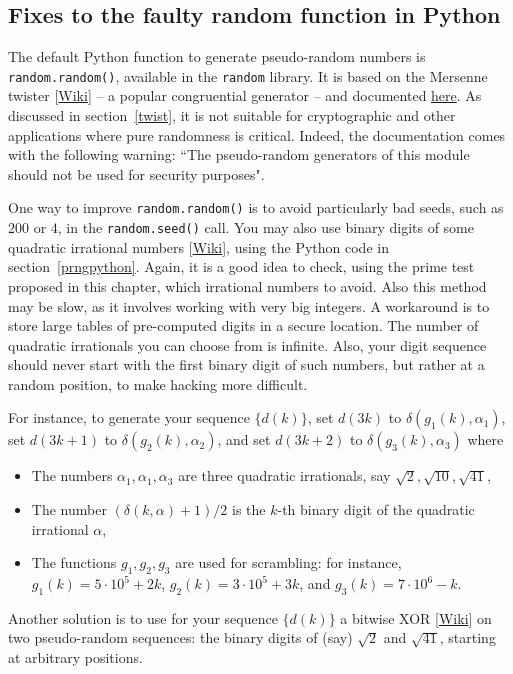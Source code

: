 \documentclass[oneside,10pt]{book}
\begin{document}
\subsection{Fixes to the faulty random function in Python}\label{fixp}

The default Python function to generate pseudo-random numbers is \texttt{random.random()}, available in the \texttt{random} library.
It is based on the \textcolor{index}{Mersenne twister} [\href{https://en.wikipedia.org/wiki/Mersenne_Twister}{Wiki}] -- 
a popular 
 \textcolor{index}{congruential generator} -- 
and documented \href{https://docs.python.org/3/library/random.html}{here}. As discussed in section~\ref{twist}, it is not suitable for cryptographic and other applications where pure randomness is critical. Indeed, the documentation comes with the following warning: ``The pseudo-random generators of this module should not be used for security purposes". 

One way to improve  \texttt{random.random()} is to avoid particularly bad seeds, such as $200$ or $4$, in the \texttt{random.seed()} call. You may also use binary digits of some 
\textcolor{index}{quadratic irrational numbers} [\href{https://en.wikipedia.org/wiki/Quadratic_irrational_number}{Wiki}], using the Python code in section~\ref{prngpython}. Again, it is a good idea to check, using the prime test proposed in this chapter, which irrational numbers to avoid. Also this method may be slow, as it involves working with very big integers. A workaround is to store large tables of pre-computed digits in a secure location. The number of quadratic irrationals you can choose from is infinite. Also, your digit sequence
 should never start with the first binary digit of such numbers, but rather at a random position, to make hacking more difficult. 

For instance, to generate your sequence $\{d(k)\}$, set $d(3k)$ to $\delta(g_1(k),\alpha_1)$, set 
 $d(3k+1)$ to $\delta(g_2(k),\alpha_2)$, and set  $d(3k+2)$ to $\delta(g_3(k),\alpha_3)$ where 
\begin{itemize}
\item The numbers $\alpha_1, \alpha_1, \alpha_3$ are three quadratic irrationals, say $\sqrt{2},\sqrt{10},\sqrt{41}$,
\item The number $(\delta(k,\alpha)+1)/2$ is the $k$-th binary digit of the quadratic irrational $\alpha$, 
\item The functions $g_1,g_2,g_3$ are used for scrambling: for instance, 
$g_1(k)=5\cdot 10^5 +2k$, $g_2(k)=3\cdot 10^5 +3k$, and $g_3(k)=7\cdot 10^6 -k$.
\end{itemize}
Another solution is to use for your sequence $\{d(k)\}$ a \textcolor{index}{bitwise XOR} [\href{https://en.wikipedia.org/wiki/Bitwise_operation}{Wiki}] on two pseudo-random sequences: the binary digits of (say) $\sqrt{2}$ and $\sqrt{41}$, starting at arbitrary positions.
\end{document}
